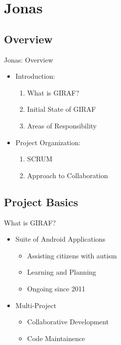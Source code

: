 \section{Jonas}
\subsection{Overview}
\begin{frame}{Jonas: Overview}
\begin{itemize}
	\item Introduction:
  		\begin{enumerate}
			\item What is GIRAF?
			\item Initial State of GIRAF
			\item Areas of Responsibility
		\end{enumerate}
	\item Project Organization:
		\begin{enumerate}
			\item SCRUM
			\item Approach to Collaboration
		\end{enumerate}
\end{itemize}
\end{frame}

\subsection{Project Basics}
\begin{frame}{What is GIRAF?}
\begin{itemize}
	\item Suite of Android Applications
		\begin{itemize}
		    \item Assisting citizens with autism 
  			\item Learning and Planning
  			\item Ongoing since 2011
		\end{itemize}
	\item Multi-Project
		\begin{itemize}
		    \item Collaborative Development 
  			\item Code Maintainence
		\end{itemize}
\end{itemize}
\end{frame}


